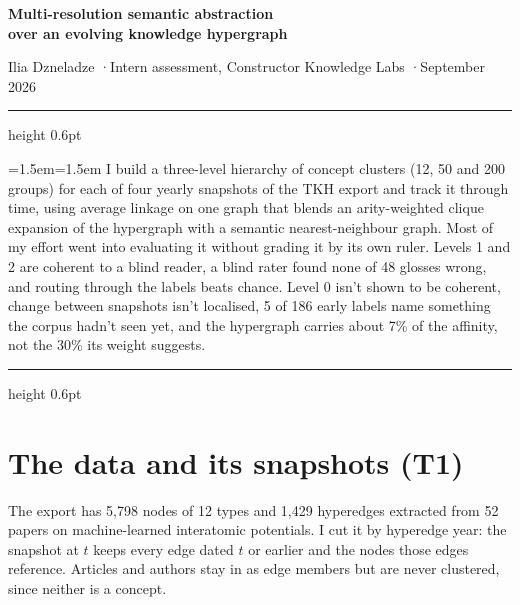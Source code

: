 \documentclass[10pt,a4paper]{article}
\begin{document}
\begin{center}
  {\LARGE\bfseries Multi-resolution semantic abstraction\\[2pt] over an evolving knowledge hypergraph\par}
  \vspace{6pt}
  {\small\color{muted}Ilia Dzneladze \quad·\quad Intern assessment, Constructor Knowledge Labs \quad·\quad September 2026\par}
\end{center}

\noindent\begin{minipage}{\linewidth}
{\color{accent}\hrule height 0.6pt}
\vspace{6.5pt}
{\small\leftskip=1.5em\rightskip=1.5em\noindent
I build a three-level hierarchy of concept clusters (12, 50 and 200 groups) for each of four yearly
snapshots of the TKH export and track it through time, using average linkage on one graph that blends an
arity-weighted clique expansion of the hypergraph with a semantic nearest-neighbour graph. Most of my
effort went into evaluating it without grading it by its own ruler. Levels 1 and 2 are coherent to a
blind reader, a blind rater found none of 48 glosses wrong, and routing through the labels beats chance.
Level 0 isn't shown to be coherent, change between snapshots isn't localised, 5 of 186 early labels name
something the corpus hadn't seen yet, and the hypergraph carries about 7\% of the affinity, not the 30\% its
weight suggests.\par}
\vspace{5.5pt}
{\color{accent}\hrule height 0.6pt}
\end{minipage}

\section{The data and its snapshots (T1)}

The export has 5,798 nodes of 12 types and 1,429 hyperedges extracted from 52 papers on machine-learned
interatomic potentials. I cut it by hyperedge year: the snapshot at $t$ keeps every edge dated $t$ or
earlier and the nodes those edges reference. Articles and authors stay in as edge members but are never
clustered, since neither is a concept.
\end{document}
